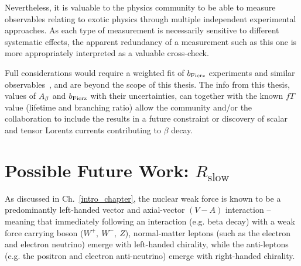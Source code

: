 Nevertheless, it is valuable to the physics community to be able to measure observables relating to exotic physics through multiple independent experimental approaches.  As each type of measurement is necessarily sensitive to different systematic effects, the apparent redundancy of a measurement such as this one is more appropriately interpreted as a valuable cross-check. 


\note{}

%
%



Full considerations would require a weighted fit of $b_{\mathrm{Fierz}}$ experiments and similar observables~\cite{Falkowski2021}, and are beyond the scope of this thesis.
The info from this thesis, values of $A_{\beta}$ and $b_{\mathrm{Fierz}}$ with their uncertainties, can together with the known $fT$ value (lifetime and
branching ratio) allow the community and/or the collaboration to include the results in a future constraint or discovery of scalar and tensor Lorentz currents
contributing to $\beta$ decay.


%
\FloatBarrier
\section{Possible Future Work:  $R_{\textrm{slow}}$}
\label{section_rslow}
As discussed in Ch.~\ref{intro_chapter}, the nuclear weak force is known to be a predominantly left-handed vector and axial-vector $(V-A)$ interaction -- meaning that immediately following an interaction (e.g. beta decay) with a weak force carrying boson ($W^+,\: W^-,\: Z$), 
normal-matter leptons (such as the electron and electron neutrino) emerge with left-handed chirality,
while the anti-leptons (e.g. the positron and electron anti-neutrino) emerge with right-handed chirality.  

